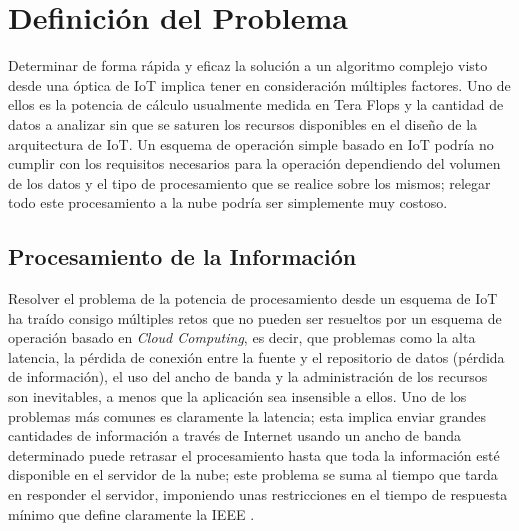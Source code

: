 
\chapter{Definición del Problema} %
\label{Chapter2}


Determinar de forma rápida y eficaz la solución a un algoritmo complejo visto desde una óptica de IoT implica tener en consideración múltiples factores. Uno de ellos es la potencia de cálculo usualmente medida en Tera Flops y la cantidad de datos a analizar sin que se saturen los recursos disponibles en el diseño de la arquitectura de IoT. Un esquema de operación simple basado en IoT podría no cumplir con los requisitos necesarios para la operación dependiendo del volumen de los datos y el tipo de procesamiento que se realice sobre los mismos; relegar todo este procesamiento a la nube podría ser simplemente muy costoso.



\section{Procesamiento de la Información}

Resolver el problema de la potencia de procesamiento desde un esquema de IoT ha traído consigo múltiples retos que no pueden ser resueltos por un esquema de operación basado en \textit{Cloud Computing}, es decir, que problemas como la alta latencia, la pérdida de conexión entre la fuente y el repositorio de datos (pérdida de información), el uso del ancho de banda y la administración de los recursos son inevitables, a menos que la aplicación sea insensible a ellos. Uno de los problemas más comunes es claramente la latencia; esta implica enviar grandes cantidades de información a través de Internet usando un ancho de banda determinado puede retrasar el procesamiento hasta que toda la información esté disponible en el servidor de la nube; este problema se suma al tiempo que tarda en responder el servidor, imponiendo unas restricciones en el tiempo de respuesta mínimo que define claramente la IEEE \citep{RTSSystems,FogBonomi}.

